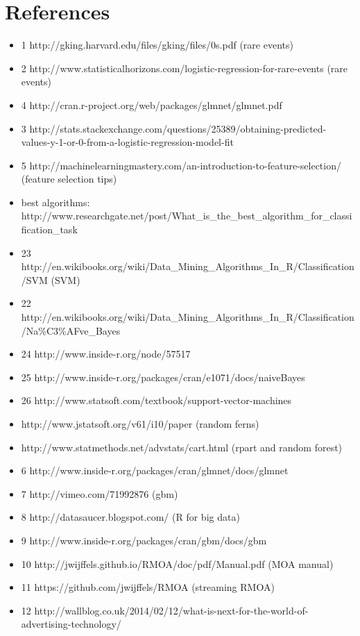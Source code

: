 \documentclass[a4paper]{article}
\begin{document}
\section*{References}
\begin{itemize}
  \item 1 http://gking.harvard.edu/files/gking/files/0s.pdf (rare events)
  \item 2 http://www.statisticalhorizons.com/logistic-regression-for-rare-events (rare events)
  \item 4 http://cran.r-project.org/web/packages/glmnet/glmnet.pdf
  \item 3 http://stats.stackexchange.com/questions/25389/obtaining-predicted-values-y-1-or-0-from-a-logistic-regression-model-fit
  \item 5 http://machinelearningmastery.com/an-introduction-to-feature-selection/ (feature selection tips)
  \item best algorithms: http://www.researchgate.net/post/What\_is\_the\_best\_algorithm\_for\_classification\_task
  \item 23 http://en.wikibooks.org/wiki/Data\_Mining\_Algorithms\_In\_R/Classification/SVM (SVM)
  \item 22 http://en.wikibooks.org/wiki/Data\_Mining\_Algorithms\_In\_R/Classification/Na\%C3\%AFve\_Bayes
  \item 24 http://www.inside-r.org/node/57517
  \item 25 http://www.inside-r.org/packages/cran/e1071/docs/naiveBayes
  \item 26 http://www.statsoft.com/textbook/support-vector-machines
  \item http://www.jstatsoft.org/v61/i10/paper (random ferns)
  \item http://www.statmethods.net/advstats/cart.html (rpart and random forest)
  \item 6 http://www.inside-r.org/packages/cran/glmnet/docs/glmnet
  \item 7 http://vimeo.com/71992876 (gbm)
  \item 8 http://datasaucer.blogspot.com/ (R for big data)
  \item 9 http://www.inside-r.org/packages/cran/gbm/docs/gbm
  \item 10 http://jwijffels.github.io/RMOA/doc/pdf/Manual.pdf (MOA manual)
  \item 11 https://github.com/jwijffels/RMOA (streaming RMOA)
  \item 12 http://wallblog.co.uk/2014/02/12/what-is-next-for-the-world-of-advertising-technology/

\end{itemize}
\end{document}
